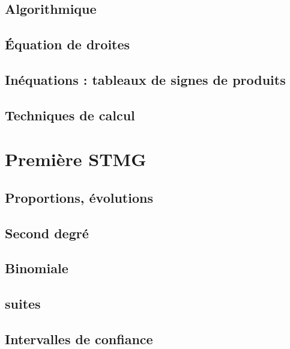 \chapter{Algorithmique}


\chapter{Équation de droites}


\chapter{Inéquations : tableaux de signes de produits}


\chapter{Techniques de calcul}


\part{Première STMG}
\chapter{Proportions, évolutions}


\chapter{Second degré}


\chapter{Binomiale}


\chapter{suites}


\chapter{Intervalles de confiance}



